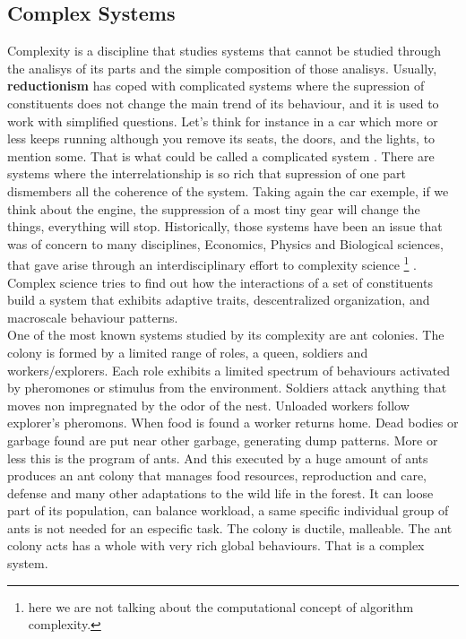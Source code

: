 \documentclass[11pt,oneside,a4paper,openright]{report}
\begin{document}
\subsection{Complex Systems}

Complexity is a discipline that studies systems that cannot be studied through the analisys of its
parts and the simple composition of those analisys. Usually, \textbf{reductionism} has coped with complicated systems
where the supression of constituents does not change the main trend of its behaviour, and it is used to
work with simplified questions. Let's think for instance in a car which more or less keeps running although 
you remove its seats, the doors, and the lights, to mention some. That is what could be called a complicated 
system \cite{MillerPage2007}.
There are systems where the interrelationship is so rich that supression of one part dismembers all the coherence
of the system. Taking again the car exemple, if we think about the engine, the suppression of a most tiny
gear will change the things, everything will stop. Historically, those systems have been an issue that was 
of concern to many disciplines, Economics, Physics and Biological sciences, that gave arise through an
interdisciplinary effort to complexity science \footnote{here we are not talking about the computational
concept of algorithm complexity.}  \cite{MelanieMitchell2009}. 
Complex science tries to find out how the interactions of a set of constituents build a system that exhibits 
adaptive traits, descentralized organization, and macroscale behaviour patterns.\\

One of the most known systems studied by its complexity are ant colonies. The colony is formed by a limited range
of roles, a queen, soldiers and workers/explorers. Each role exhibits a limited spectrum of behaviours activated by pheromones or stimulus from the environment. Soldiers attack anything that moves non impregnated by the odor of the nest. Unloaded workers follow explorer's pheromons. When food is found a worker returns home. Dead bodies or garbage found are put near other garbage, generating dump patterns. More or less this is the program of ants. And this executed by a huge amount of ants produces an ant colony that manages food resources, reproduction and care, defense and many
other adaptations to the wild life in the forest. It can loose part of its population, can balance workload, a same specific individual group of ants is not needed for an especific task. The colony is ductile, malleable. The ant 
colony acts has a whole with very rich global behaviours. That is a complex system.\\
\end{document}
